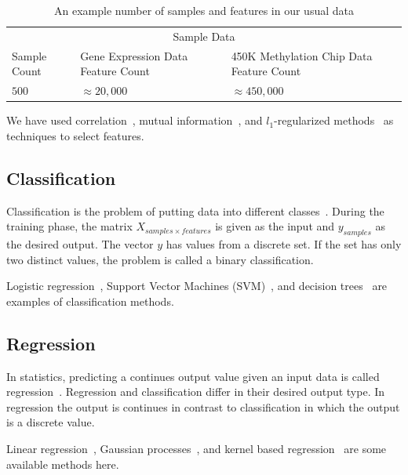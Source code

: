 \begin{table}[th!]
  \centering
  \begin{tabular}{p{3cm} p{3.5cm} p{4cm}}
    \hline
    \multicolumn{3}{c}{Sample Data} \\
    \cline{1-3}
    Sample Count   & Gene Expression Data Feature Count & 450K Methylation Chip Data Feature Count \\
    \hline
    $500$      & $\approx 20,000$    & $\approx 450,000$   \\
    \hline
  \end{tabular}
  \caption{An example number of samples and features in our usual data}
  \label{tab:sample-sample-size}
\end{table}

We have used correlation~\cite{correlation}, mutual information~\cite{mutual-information}, and $l_1$-regularized methods~\cite{l1-regularized} as techniques to select features.

\subsection{Classification}
Classification is the problem of putting data into different classes~\cite{statistical-learning}. During the training phase, the matrix $X_{samples \times features}$ is given as the input and $y_{samples}$ as the desired output. The vector $y$ has values from a discrete set. If the set has only two distinct values, the problem is called a binary classification.

Logistic regression~\cite{logistic-regression1,logistic-regression2}, Support Vector Machines (SVM)~\cite{svm1,svm2}, and decision trees~\cite[TODO:chapter]{statistical-learning} are examples of classification methods.

\subsection{Regression}
In statistics, predicting a continues output value given an input data is called regression~\cite[TODO:chapter]{statistical-learning}. Regression and classification differ in their desired output type. In regression the output is continues in contrast to classification in which the output is a discrete value.

Linear regression~\cite[TODO:chapter]{statistical-learning}, Gaussian processes~\cite{gaussian-processes}, and kernel based regression~\cite[TODO:chapter]{learning-with-kernels} are some available methods here.


